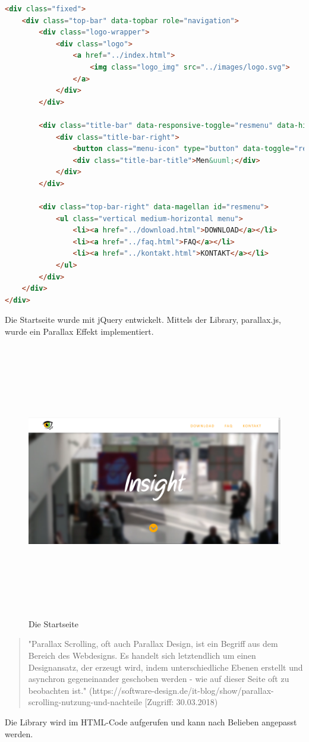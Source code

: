 \lstset{
  frame=leftline,
  breaklines=true,
}
\begin{lstlisting}[language=HTML, basicstyle=\scriptsize]
<div class="fixed">
	<div class="top-bar" data-topbar role="navigation">
		<div class="logo-wrapper">
			<div class="logo">
				<a href="../index.html">
					<img class="logo_img" src="../images/logo.svg">
				</a>
			</div>
		</div>

		<div class="title-bar" data-responsive-toggle="resmenu" data-hide-for="medium">
			<div class="title-bar-right">
				<button class="menu-icon" type="button" data-toggle="resmenu"></button>
				<div class="title-bar-title">Men&uuml;</div>
			</div>
		</div>

		<div class="top-bar-right" data-magellan id="resmenu">
			<ul class="vertical medium-horizontal menu">
				<li><a href="../download.html">DOWNLOAD</a></li>
				<li><a href="../faq.html">FAQ</a></li>
				<li><a href="../kontakt.html">KONTAKT</a></li>
			</ul>
		</div>
	</div>
</div>
\end{lstlisting} \leavevmode \newline
Die Startseite wurde mit jQuery entwickelt. Mittels der Library, parallax.js, wurde ein Parallax Effekt implementiert. 
\begin{figure}[ht]
	\centering				\includegraphics[width=12cm,height=12cm,keepaspectratio]{webseite_abb5} 
	\caption{Die Startseite}
\end{figure}
\begin{quote}
"Parallax Scrolling, oft auch Parallax Design, ist ein Begriff aus dem Bereich des Webdesigns. Es handelt sich letztendlich um einen Designansatz, der erzeugt wird, indem unterschiedliche Ebenen erstellt und asynchron gegeneinander geschoben werden - wie auf dieser Seite oft zu beobachten ist." (https://software-design.de/it-blog/show/parallax-scrolling-nutzung-und-nachteile [Zugriff: 30.03.2018)
\end{quote}
Die Library wird im HTML-Code aufgerufen und kann nach Belieben angepasst werden. \leavevmode \newpage
